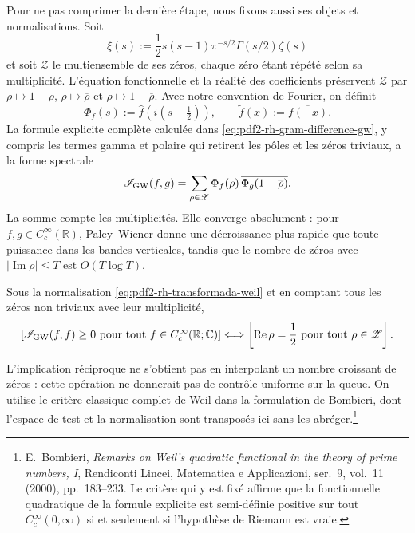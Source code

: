 Pour ne pas comprimer la dernière étape, nous fixons aussi ses objets et
normalisations. Soit
\[
 \xi(s):=\frac12s(s-1)\pi^{-s/2}\Gamma(s/2)\zeta(s)
\]
et soit \(\mathscr Z\) le multiensemble de ses zéros, chaque zéro étant répété selon
sa multiplicité. L'équation fonctionnelle et la réalité des coefficients
préservent \(\mathscr Z\) par
\(\rho\mapsto1-\rho\), \(\rho\mapsto\overline\rho\) et
\(\rho\mapsto1-\overline\rho\). Avec notre convention de Fourier, on définit
\begin{equation}\label{eq:pdf2-rh-transformada-weil}
 \Phi_f(s):=\widehat f\!\left(i(s-\tfrac12)\right),
 \qquad
 \widetilde f(x):=\overline{f(-x)}.
\end{equation}
La formule explicite complète calculée dans
\eqref{eq:pdf2-rh-gram-difference-gw}, y compris les termes gamma et polaire
qui retirent les pôles et les zéros triviaux, a la forme spectrale
\begin{equation}\label{eq:pdf2-rh-formula-espectral-weil}
 \mathscr I_{\rm GW}(f,g)
 =\sum_{\rho\in\mathscr Z}
   \Phi_f(\rho)\,
   \overline{\Phi_g(1-\overline\rho)}.
\end{equation}
La somme compte les multiplicités. Elle converge absolument : pour
\(f,g\in C_c^\infty(\mathbb R)\), Paley--Wiener donne une décroissance plus rapide
que toute puissance dans les bandes verticales, tandis que le nombre de zéros avec
\(|\operatorname{Im}\rho|\leq T\) est \(O(T\log T)\).

\begin{proposition}
\label{prop:pdf2-rh-criterio-weil-desplegado}
Sous la normalisation
\eqref{eq:pdf2-rh-transformada-weil} et en comptant tous les zéros non triviaux
avec leur multiplicité,
\begin{equation}\label{eq:pdf2-rh-criterio-weil}
 \left[
  \mathscr I_{\rm GW}(f,f)\geq0
  \text{ pour tout }f\in C_c^\infty(\mathbb R;\mathbb C)
 \right]
 \Longleftrightarrow
 \left[
  \operatorname{Re}\rho=\frac12
  \text{ pour tout }\rho\in\mathscr Z
 \right].
\end{equation}
\end{proposition}

L'implication réciproque ne s'obtient pas en interpolant un nombre croissant de
zéros : cette opération ne donnerait pas de contrôle uniforme sur la queue. On utilise le
critère classique complet de Weil dans la formulation de Bombieri, dont l'espace
de test et la normalisation sont transposés ici sans les abréger.\footnote{%
E.~Bombieri, \emph{Remarks on Weil's quadratic functional in the theory of
prime numbers, I}, Rendiconti Lincei, Matematica e Applicazioni, ser.~9,
vol.~11 (2000), pp.~183--233. Le critère qui y est fixé affirme que la fonctionnelle
quadratique de la formule explicite est semi-définie positive sur tout
\(C_c^\infty(0,\infty)\) si et seulement si l'hypothèse de Riemann est vraie.}


